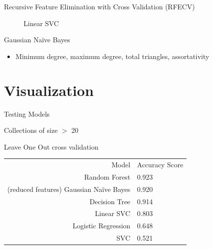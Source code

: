 \documentclass{beamer}
\begin{document}
\begin{frame}{Recursive Feature Elimination with Cross Validation (RFECV)}
\begin{figure}
\begin{minipage}[t]{.3\textwidth}
            \caption{\tiny{Linear SVC}}
            \label{fig:svc}
        \end{minipage}
    \end{figure}
    Gaussian Na\"ive Bayes
\begin{itemize}
    \item Minimum degree, maximum degree, total triangles, assortativity
\end{itemize}
    
    
\end{frame} %






    
\section{Visualization}


\begin{frame}{Testing Models}

Collections of size $>$ 20

    Leave One Out cross validation 
    
    \begin{table}[]
        \centering
        \begin{tabular}{rl}
            Model & Accuracy Score \\
            Random Forest & 0.923 \\
            (reduced features) Gaussian Na\"ive Bayes &  0.920 \\
            Decision Tree & 0.914 \\
            Linear SVC & 0.803 \\
            Logistic Regression &  0.648 \\
            SVC & 0.521
        \end{tabular}

        \label{tab:my_label}
    \end{table}
    
    
    
\end{frame}
\end{document}

